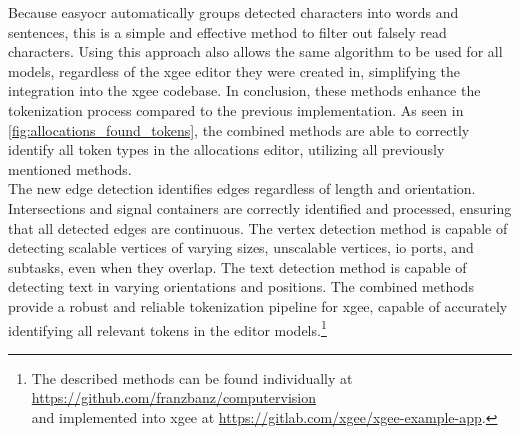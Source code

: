 Because easy\acrshort{ocr} automatically groups detected characters into words and sentences, this is a simple and effective method to filter out falsely read characters. Using this approach also allows the same algorithm to be used for all models, regardless of the \acrshort{xgee} editor they were created in, simplifying the integration into the \acrshort{xgee} codebase.
In conclusion, these methods enhance the tokenization process compared to the previous implementation. As seen in \autoref{fig:allocations_found_tokens}, the combined methods are able to correctly identify all token types in the allocations editor, utilizing all previously mentioned methods.\\
The new edge detection identifies edges regardless of length and orientation. Intersections and signal containers are correctly identified and processed, ensuring that all detected edges are continuous. The vertex detection method is capable of detecting scalable vertices of varying sizes, unscalable vertices, \acrshort{io} ports, and subtasks, even when they overlap. The text detection method is capable of detecting text in varying orientations and positions. The combined methods provide a robust and reliable tokenization pipeline for \acrshort{xgee}, capable of accurately identifying all relevant tokens in the editor models.\footnote{The described methods can be found individually at \url{https://github.com/franzbanz/computervision}\\and implemented into \acrshort{xgee} at \url{https://gitlab.com/xgee/xgee-example-app}.}